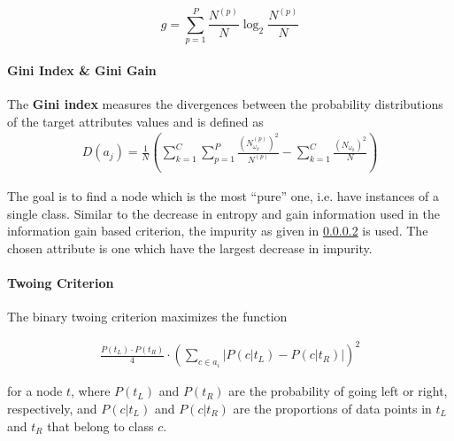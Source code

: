 \begin{equation}
    g = \sum_{p=1}^P \frac{N^{(p)}}{N} \log_2 \frac{N^{(p)}}{N} \label{gainratio}
\end{equation}




\paragraph{Gini Index \& Gini Gain}

\begin{definition}
    The \textbf{Gini index} measures the divergences between the probability distributions of the target attributes values and is defined as
\begin{align}
    D(a_j) = \frac{1}{N}\left( \sum_{k=1}^{C}\sum_{p=1}^{P} \frac{\left( N_{\omega_k}^{(p)} \right)^2  }{N^{(p)}} - \sum_{k=1}^C \frac{\left( N_{\omega_k}\right)^2  }{N} \right)
\end{align}

\end{definition}

The goal is to find a node which is the most ``pure'' one, i.e. have instances of a single class. Similar to the decrease in entropy and gain information used in the information gain based criterion, the impurity as given in \ref{} is used. The chosen attribute is one which have the largest decrease in impurity.


\paragraph{Twoing Criterion}

\begin{definition}

The binary twoing criterion maximizes the function

\begin{align}
    \frac{P(t_L) \cdot P(t_R)}{4} \cdot \left( \sum_{c \in a_i} \left| P(c|t_L) - P(c|t_R) \right| \right) ^2
\end{align}

for a node $t$, where $P(t_L)$ and $P(t_R)$ are the probability of going left or right, respectively, and $P(c|t_L)$ and $P(c|t_R)$ are the proportions of data points in $t_L$ and $t_R$ that belong to class $c$.

\end{definition} 


